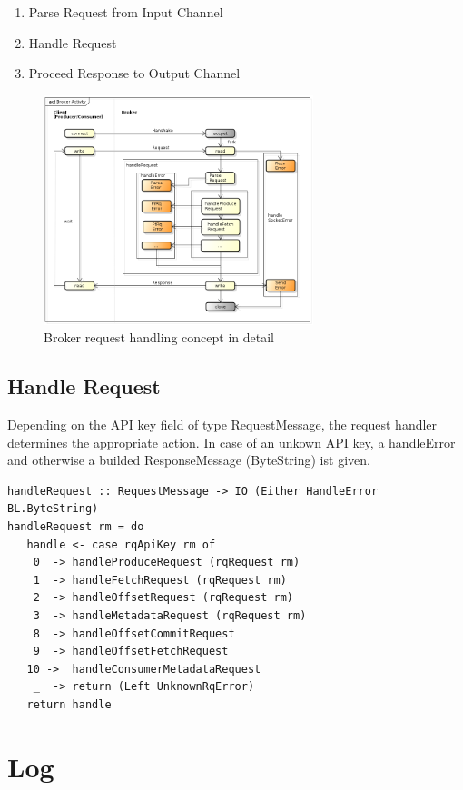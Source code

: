 \begin{enumerate}
\item Parse Request from Input Channel 
\item Handle Request
\item Proceed Response to Output Channel
\end{enumerate}


\begin{figure}[H]
    \centering
    \includegraphics[width=0.7\textwidth]{images/broker-activity-detail.png}
    \caption{Broker request handling concept in detail}
    \label{fig:broker-activity-detail.png}
\end{figure}

\subsection{Handle Request}
Depending on the API key field of type RequestMessage, the request handler
determines the appropriate action. In case of an unkown API key, a handleError
and otherwise a builded ResponseMessage (ByteString) ist given. 

\begin{lstlisting}
handleRequest :: RequestMessage -> IO (Either HandleError BL.ByteString)
handleRequest rm = do
   handle <- case rqApiKey rm of
    0  -> handleProduceRequest (rqRequest rm)
    1  -> handleFetchRequest (rqRequest rm)
    2  -> handleOffsetRequest (rqRequest rm)
    3  -> handleMetadataRequest (rqRequest rm)
    8  -> handleOffsetCommitRequest 
    9  -> handleOffsetFetchRequest
   10 ->  handleConsumerMetadataRequest
    _  -> return (Left UnknownRqError)
   return handle
\end{lstlisting}

\section{Log}

